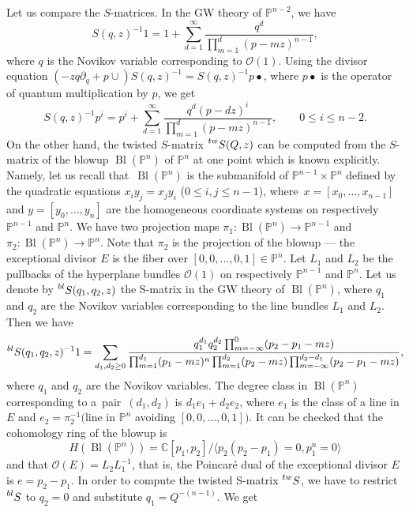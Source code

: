 \documentclass[pdftex]{sigma}
\numberwithin{equation}{section}
\newcommand{\leftexp}[2]{{\vphantom{#2}}^{#1}{#2}}
\newcommand{\CC}{\mathbb{C}}
\newcommand{\PP}{\mathbb{P}}
\renewcommand{\O}{\mathcal{O}}
\begin{document}
Let us compare the $S$-matrices. In the GW theory of $\PP^{n-2}$, we
have
\[
S(q,z)^{-1} 1 = 1 + \sum_{d=1}^\infty
\frac{q^d}{\prod_{m=1}^d (p- m z)^{n-1}},
\]
where $q$ is the Novikov variable corresponding to $\O(1)$.
Using the divisor equation $(-z q\partial_q + p\cup) S(q,z)^{-1} =
S(q,z)^{-1} p\bullet$, where $p\bullet$ is the operator of quantum
multiplication by $p$, we get
\begin{equation}\label{S-proj}
S(q,z)^{-1} p^i = p^i + \sum_{d=1}^\infty
\frac{q^d (p-d z)^i }{\prod_{m=1}^d (p-m z)^{n-1}},
\qquad 0\leq i\leq n-2.
\end{equation}
On the other hand, the twisted $S$-matrix $\leftexp{tw}{S}(Q,z)$ can
be computed from the $S$-matrix of the blowup
$\operatorname{Bl}(\PP^n)$ of $\PP^n$ at one point
which is known explicitly. Namely, let us recall that~$\operatorname{Bl}(\PP^n)$ is the submanifold of $\PP^{n-1}\times
\PP^n$ defined by the quadratic equations $x_i y_j=x_j y_i$
($0\leq i,j\leq n-1$), where~${x=[x_0,\dots, x_{n-1}]}$ and
$y=[y_0,\dots,y_{n}]$ are the homogeneous coordinate systems on
respectively $\PP^{n-1}$ and $\PP^{n}$. We have two projection maps
$\pi_1\colon \operatorname{Bl}(\PP^n)\to \PP^{n-1}$ and
${\pi_2\colon \operatorname{Bl}(\PP^n)\to \PP^{n}}$. Note that $\pi_2$ is the
projection of the blowup --- the exceptional divisor $E$ is the fiber
over $[0,0,\dots,0,1]\in \PP^n$. Let $L_1$ and $L_2$ be the pullbacks
of the hyperplane bundles $\O(1)$ on respectively $\PP^{n-1}$ and
$\PP^{n}$. Let us denote by $\leftexp{bl}{S}(q_1,q_2,z)$ the S-matrix
in the GW theory of $\operatorname{Bl}(\PP^n)$, where $q_1$ and $q_2$
are the Novikov variables corresponding to the line bundles $L_1$ and
$L_2$. Then we have
\[
\leftexp{bl}{S}(q_1,q_2,z)^{-1} 1 =
\sum_{d_1,d_2\geq 0}
\frac{q_1^{d_1} q_2^{d_2} \prod_{m=-\infty}^0 (p_2-p_1 -mz) }{
\prod_{m=1}^{d_1} (p_1-mz)^n
\prod_{m=1}^{d_2} (p_2-mz)
\prod_{m=-\infty}^{d_2-d_1} (p_2-p_1 -mz)},
\]
where $q_1$ and $q_2$ are the Novikov variables. The degree class in
$\operatorname{Bl}(\PP^n) $ corresponding to a~pair~${(d_1,d_2)}$ is
$d_1 e_1+ d_2 e_2$, where $e_1$ is the class of a line in $E$ and
$e_2=\pi_2^{-1}($line in $\PP^n$ avoiding $[0,0,\dots,0,1])$. It can
be checked that the cohomology ring of the blowup is
\[
H(\operatorname{Bl}(\PP^n))=\CC[p_1,p_2]/
\langle p_2(p_2-p_1)=0, p_1^n=0\rangle
\]
and that $\O(E)=L_2L_1^{-1}$, that is, the Poincar\'e dual of the
exceptional divisor $E$ is $e=p_2-p_1$. In order to compute the
twisted S-matrix $\leftexp{tw}{S}$, we have to restrict
$\leftexp{bl}{S}$ to $q_2=0$ and substitute $q_1=Q^{-(n-1)}$. We get
\end{document}
